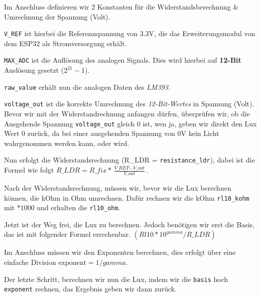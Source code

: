 \documentclass[18pt]{article}
\begin{document}
Im Anschluss definieren wir 2 Konstanten für die Widerstandsberechnung \& Umrechnung der Spannung (Volt).

\texttt{V\_REF} ist hierbei die Referenzspannung von 3.3V, die das Erweiterungsmodul von dem ESP32 als Stromversorgung erhält.

\texttt{MAX\_ADC} ist die Auflösung des analogen Signals. Dies wird hierbei auf \textbf{12-Bit} Auslösung gesetzt ($2^{21} - 1$).

\texttt{raw\_value} erhält nun die analogen Daten des \textit{LM393}.

\texttt{voltage\_out} ist die korrekte Umrechnung des \textit{12-Bit-Wertes} in Spannung (Volt).
Bevor wir mit der Widerstandrechnung anfangen dürfen, überprüfen wir, ob die Ausgehende Spannung \texttt{voltage\_out} gleich 0 ist, wen ja, geben wir direkt den Lux Wert 0 zurück, da bei einer ausgehenden Spannung von 0V kein Licht wahrgenommen werden kann, oder wird.

Nun erfolgt die Widerstandsrechnung (R\_LDR = \texttt{resistance\_ldr}), dabei ist die Formel wie folgt $\textit{R\_LDR} = \textit{R\_fix} * \frac{\textit{V\_REF} - \textit{V\_out}}{\textit{V\_out}}$.

Nach der Widerstandsrechnung, müssen wir, bevor wir die Lux berechnen können, die kOhm in Ohm umrechnen. Dafür rechnen wir die kOhm \texttt{rl10\_kohm} mit $* 1000$ und erhalten die \texttt{rl10\_ohm}.

Jetzt ist der Weg frei, die Lux zu berechnen. Jedoch benötigen wir erst die Basis, das ist mit folgender Formel errechenbar. $(Rl10 * 10^{gamma} / \textit{R\_LDR})$

Im Anschluss müssen wir den Exponenten berechnen, dies erfolgt über eine einfache Division $\text{exponent} = 1 / gamma$.

Der letzte Schritt, berechnen wir nun die Lux, indem wir die \texttt{basis} hoch \texttt{exponent} rechnen, das Ergebnis geben wir dann zurück.
\end{document}
